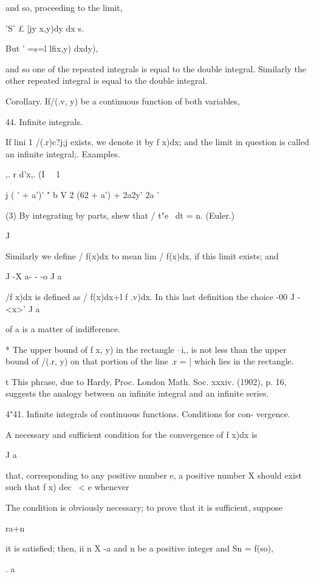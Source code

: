 and so, proceeding to the limit,

'S' £ [jy x,y)dy dx s.

But ' =s=l lfix,y) dxdy),

and so one of the repeated integrals is equal to the double integral.
Similarly the other repeated integral is equal to the double integral.

Corollary. If/(.v, y) be a continuous function of both variables,

44. Infinite integrals.

If lini 1 /(.r)c?j;j exists, we denote it by f x)dx; and the limit in
question is called an infinite integral;. Examples.

,. r d'x,. (I \ \ 1

  j ( ' + a')' " b V 2 (62 + a') + 2a2y' 2a '

(3) By integrating by parts, shew that / t"e~ dt = n. (Euler.)

J

Similarly we define / f(x)dx to mean lim / f(x)dx, if this limit
exists; and

J -X a- - -o J a

/f x)dx is defined as / f(x)dx+l f .v)dx. In this last definition the
choice -00 J -<x>' J a

of a is a matter of indifference.

* The upper bound of f x, y) in the rectangle --i,, is not less than
the upper bound of /(.r, y) on that portion of the line .r = | which
lies in the rectangle.

t This phrase, due to Hardy, Proc. London Math. Soc. xxxiv. (1902), p.
16, suggests the analogy between an infinite integral and an infinite
series.

%
%

4"41. Infinite integrals of continuous functions. Conditions for con-
vergence.

A necessary and sufficient condition for the convergence of f x)dx is

J a

that, corresponding to any positive number e, a positive number X
should exist such that f x) dec \ < e whenever

The condition is obviously necessary; to prove that it is sufficient,
suppose

ra+n

it is satisfied; then, ii n X -a and n be a positive integer and Sn =
f(so),

. a

